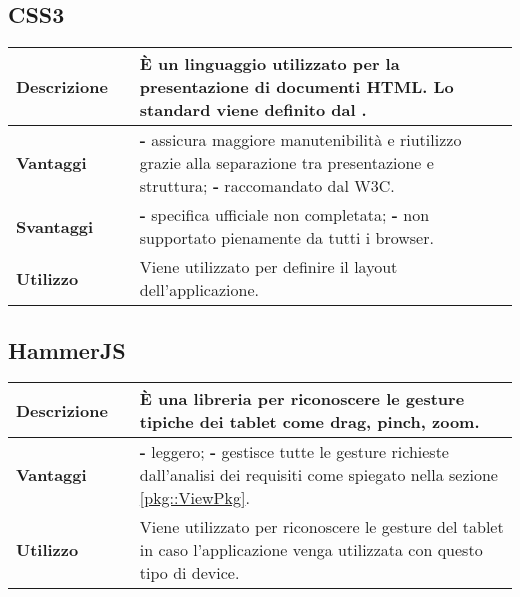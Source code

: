\subsection{CSS3}
\label{CSS3}
\begin{table}[H]
	\centering
	\begin{tabular}{p{2cm}p{0.5cm}p{11.5cm}}
		\arrayrulecolor{lightgray}
		\toprule
		\textbf{Descrizione} & &
		È un linguaggio utilizzato per la presentazione di documenti HTML. Lo standard viene definito dal \glo{W3C}{W3C}.
		\\ \midrule
		\textbf{Vantaggi} & &
		\textbf{- }assicura maggiore manutenibilità e riutilizzo grazie alla separazione tra presentazione e struttura;
		\newline
		\textbf{- }raccomandato dal W3C.
		\\ \midrule
		\textbf{Svantaggi} & &
		\textbf{- }specifica ufficiale non completata;
		\newline
		\textbf{- }non supportato pienamente da tutti i browser.
		\\ \midrule
		\textbf{Utilizzo} & &
		Viene utilizzato per definire il layout dell'applicazione.
		\\ \bottomrule
	\end{tabular}
\end{table}


\newpage
\subsection{HammerJS}
\label{HammerJS}
\begin{table}[H]
	\centering
	\begin{tabular}{p{2cm}p{0.5cm}p{11.5cm}}
		\arrayrulecolor{lightgray}
		\toprule
		\textbf{Descrizione} & &
		È una libreria \js{} per riconoscere le gesture tipiche dei tablet come drag, pinch, zoom.
		\\ \midrule
		\textbf{Vantaggi} & &
		\textbf{- }leggero;
		\newline
		\textbf{- }gestisce tutte le gesture richieste dall'analisi dei requisiti come spiegato nella sezione \ref{pkg::ViewPkg}.
		\\ \midrule
		\textbf{Utilizzo} & &
		Viene utilizzato per riconoscere le gesture del tablet in caso l'applicazione venga utilizzata con questo tipo di device.
		\\ \bottomrule
	\end{tabular}
\end{table}



